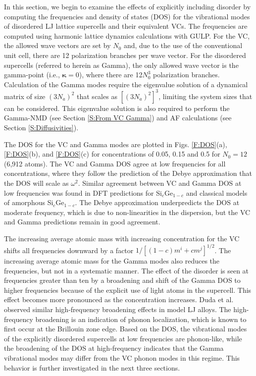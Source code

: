 \documentclass[12pt,twocolumn,iop]{/usr/share/texmf-texlive/tex/latex/iop/iopart}[/usr/share/texmf-texlive/tex/latex/iop/]
\begin{document}
In this section, we begin to examine the effects of explicitly including 
disorder by computing the frequencies and density of states (DOS)  
for the vibrational modes of disordered LJ lattice supercells and their 
equivalent VCs. The frequencies 
are computed using harmonic lattice dynamics calculations with  
GULP.\cite{gale_general_2003}  For the 
VC, the allowed wave vectors are set by $N_0$ and, due to the use of the 
conventional unit cell, there are 12 
polarization branches per wave vector.  
For the disordered supercells (referred to herein as Gamma),
the only allowed wave vector is the gamma-point (i.e., $\pmb{\kappa}=0$),  
where there are 12$N_0^3$ polarization branches. Calculation of the 
Gamma modes require the eigenvalue solution of a dynamical matrix of size 
$(3N_a)^2$ that scales as $[(3N_a)^2]^3$, limiting the system 
sizes that can be considered. This eigenvalue solution is also 
required to perform the Gamma-NMD (see Section \ref{S:From VC Gamma})  
and AF calculations (see Section \ref{S:Diffusivities}). 

The DOS for the VC and Gamma modes are plotted in Figs. \ref{F:DOS}(a), 
\ref{F:DOS}(b), and \ref{F:DOS}(c) 
for concentrations of 0.05, 0.15 and 0.5 for 
$N_0=12$ (6,912 atoms). The VC and Gamma DOS 
agree at low frequencies for all concentrations, 
where they follow the prediction of the Debye approximation that 
the DOS will scale as $\omega^2$.\cite{ashcroft_solid_1976} 
Similar agreement between VC and Gamma DOS at low frequencies 
was found in DFT predictions 
for Si$_c$Ge$_{1-c}$\cite{garg_role_2011} and 
classical models of amorphous Si$_c$Ge$_{1-c}$.
\cite{bouchard_vibrational_1988} The Debye approximation 
underpredicts the DOS at moderate frequency, which is due to 
non-linearities in the dispersion,\cite{ashcroft_solid_1976} but the 
VC and Gamma predictions remain in good agreement. 

The increasing average atomic  
mass with increasing concentration for the VC shifts all   
frequencies downward by a factor $1/[(1-c)m^i + cm^j]^{1/2}$. 
The increasing average atomic 
mass for the Gamma modes also reduces the frequencies, but not in a 
systematic manner. 
The effect of the disorder is seen at frequencies greater than 
ten by a broadening and shift of the Gamma DOS to higher frequencies 
because of the explicit use of light atoms in the supercell. This effect 
becomes more pronounced as the concentration increases.  
Duda et al. 
observed similar high-frequency broadening effects in model LJ alloys.
\cite{duda_reducing_2011} The high-frequency broadening is an indication 
of phonon localization, which is known to first occur at the 
Brillouin zone edge.\cite{chu_effect_1989} 
Based on the DOS, the vibrational modes of the explicitly disordered 
supercells at low frequencies are phonon-like, while the broadening 
of the DOS at high-frequency indicates that the Gamma 
vibrational modes may differ from the VC phonon modes in this regime. 
This behavior is further investigated in the next three sections. 
\end{document}
